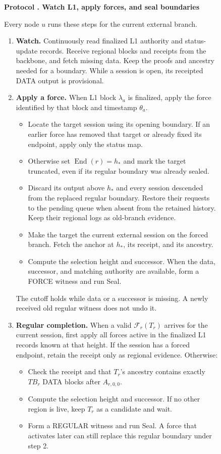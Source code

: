 \documentclass[11pt,a4paper]{article}
\newcommand{\FC}{\mathcal F}
\newcommand{\End}{\operatorname{End}}
\newcommand{\TB}{\mathit{TB}}
\newcounter{protocol}
\newenvironment{protocol}[2]{\begin{figure}[htbp]\refstepcounter{protocol}\label{#1}
\begin{mdframed}[linewidth=.6pt,skipabove=0pt,skipbelow=0pt,
innertopmargin=7pt,innerbottommargin=7pt]\small
\textbf{Protocol \theprotocol. #2}\par\smallskip}{\end{mdframed}\end{figure}}
\begin{document}
\begin{protocol}{alg:external}{Watch L1, apply forces, and seal boundaries}
\color{rrRed}
Every node $u$ runs these steps for the current external branch.
\begin{enumerate}[label=\textbf{\arabic*)},itemsep=3pt]
\item \textbf{Watch.} Continuously read finalized L1 authority and
status-update records. Receive regional blocks and receipts from the
backbone, and fetch missing data. Keep the proofs and ancestry needed
for a boundary. While a session is open, its receipted DATA output is
provisional.

\item \textbf{Apply a force.} When L1 block $\lambda_a$ is finalized,
apply the force identified by that block and timestamp $\theta_a$.
\begin{itemize}
\item Locate the target session using its opening boundary. If an
earlier force has removed that target or already fixed its endpoint,
apply only the status map.
\item Otherwise set $\End(r)=h_*$ and mark the target truncated, even
if its regular boundary was already sealed.
\item Discard its output above $h_*$ and every session descended from
the replaced regular boundary. Restore their requests to the pending
queue when absent from the retained history. Keep their regional logs
as old-branch evidence.
\item Make the target the current external session on the forced
branch. Fetch the anchor at $h_*$, its receipt, and its ancestry.
\item Compute the selection height and successor. When the data,
successor, and matching authority are available, form a FORCE witness
and run Seal.
\end{itemize}
The cutoff holds while data or a successor is missing. A newly received
old regular witness does not undo it.

\item \textbf{Regular completion.} When a valid $\FC_r(T_r)$ arrives for
the current session, first apply all forces active in the finalized L1
records known at that height. If the session has a forced endpoint,
retain the receipt only as regional evidence. Otherwise:
\begin{itemize}
\item Check the receipt and that $T_r$'s ancestry contains exactly
$\TB_r$ DATA blocks after $A_{r,0,0}$.
\item Compute the selection height and successor. If no other region
is live, keep $T_r$ as a candidate and wait.
\item Form a REGULAR witness and run Seal. A force that activates later
can still replace this regular boundary under step 2.
\end{itemize}


\end{enumerate}
\end{protocol}
\end{document}
